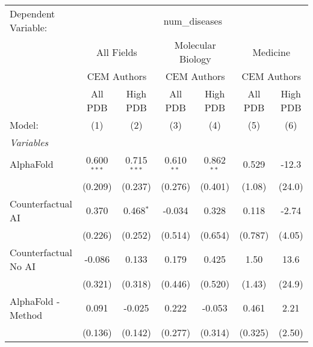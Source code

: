 \begingroup
\centering
\begin{tabular}{lcccccc}
   \tabularnewline \midrule \midrule
   Dependent Variable: & \multicolumn{6}{c}{num\_diseases}\\
 & \multicolumn{2}{c}{All Fields} & \multicolumn{2}{c}{Molecular Biology} & \multicolumn{2}{c}{Medicine} \\
\cmidrule(lr){2-3} \cmidrule(lr){4-5} \cmidrule(lr){6-7}
 & \multicolumn{2}{c}{CEM Authors} & \multicolumn{2}{c}{CEM Authors} & \multicolumn{2}{c}{CEM Authors} \\
\cmidrule(lr){2-3} \cmidrule(lr){4-5} \cmidrule(lr){6-7}
 & \multicolumn{1}{c}{All PDB} & \multicolumn{1}{c}{High PDB} & \multicolumn{1}{c}{All PDB} & \multicolumn{1}{c}{High PDB} & \multicolumn{1}{c}{All PDB} & \multicolumn{1}{c}{High PDB} \\
\cmidrule(lr){2-2} \cmidrule(lr){3-3} \cmidrule(lr){4-4} \cmidrule(lr){5-5} \cmidrule(lr){6-6} \cmidrule(lr){7-7}
   Model:                                                     & (1)           & (2)           & (3)          & (4)           & (5)           & (6)\\  
   \midrule
   \emph{Variables}\\
   AlphaFold                                                  & 0.600$^{***}$ & 0.715$^{***}$ & 0.610$^{**}$ & 0.862$^{**}$  & 0.529         & -12.3\\   
                                                              & (0.209)       & (0.237)       & (0.276)      & (0.401)       & (1.08)        & (24.0)\\   
   Counterfactual AI                                          & 0.370         & 0.468$^{*}$   & -0.034       & 0.328         & 0.118         & -2.74\\   
                                                              & (0.226)       & (0.252)       & (0.514)      & (0.654)       & (0.787)       & (4.05)\\   
   Counterfactual No AI                                       & -0.086        & 0.133         & 0.179        & 0.425         & 1.50          & 13.6\\   
                                                              & (0.321)       & (0.318)       & (0.446)      & (0.520)       & (1.43)        & (24.9)\\   
   AlphaFold - Method                                         & 0.091         & -0.025        & 0.222        & -0.053        & 0.461         & 2.21\\   
                                                              & (0.136)       & (0.142)       & (0.277)      & (0.314)       & (0.325)       & (2.50)\\   

\end{tabular}
